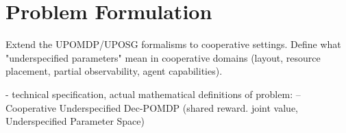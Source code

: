 \chapter{Problem Formulation}\label{sec:Problem}

Extend the UPOMDP/UPOSG formalisms to cooperative settings. Define what "underspecified parameters" mean in cooperative domains (layout, resource placement, partial observability, agent capabilities).

- technical specification,  actual mathematical definitions of problem: 
-- Cooperative Underspecified Dec-POMDP (shared reward. joint value, Underspecified Parameter Space)